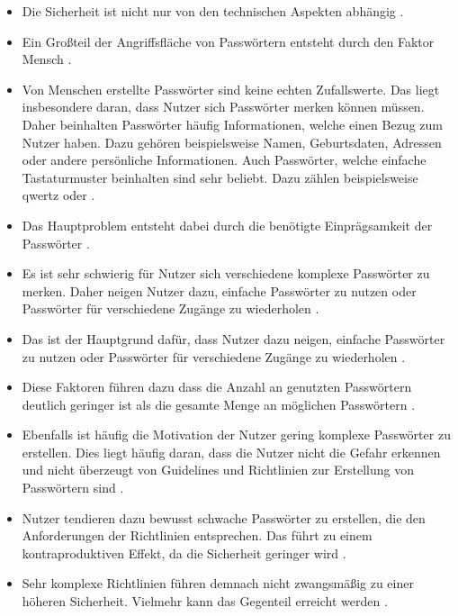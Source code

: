 \begin{itemize}
    \item Die Sicherheit ist nicht nur von den technischen Aspekten abhängig \cite{ives2004domino}.
    \item Ein Großteil der Angriffsfläche von Passwörtern entsteht durch den Faktor Mensch \cite{yildirim2019encouraging}.
    \item Von Menschen erstellte Passwörter sind keine echten Zufallswerte. Das liegt insbesondere daran, dass Nutzer sich Passwörter merken können müssen. Daher beinhalten Passwörter häufig Informationen, welche einen Bezug zum Nutzer haben. Dazu gehören beispielsweise Namen, Geburtsdaten, Adressen oder andere persönliche Informationen. Auch Passwörter, welche einfache Tastaturmuster beinhalten sind sehr beliebt. Dazu zählen beispielsweise \glqq qwertz\grqq{} oder \grqq{} \cite{chanda2016password} \cite{boonkrong2012security} \cite{yildirim2019encouraging}.
    \item Das Hauptproblem entsteht dabei durch die benötigte Einprägsamkeit der Passwörter \cite{yildirim2019encouraging}.
    \item Es ist sehr schwierig für Nutzer sich verschiedene komplexe Passwörter zu merken. Daher neigen Nutzer dazu, einfache Passwörter zu nutzen oder Passwörter für verschiedene Zugänge zu wiederholen \cite{chanda2016password}.
    \item Das ist der Hauptgrund dafür, dass Nutzer dazu neigen, einfache Passwörter zu nutzen oder Passwörter für verschiedene Zugänge zu wiederholen \cite{yildirim2019encouraging}.
    \item Diese Faktoren führen dazu dass die Anzahl an genutzten Passwörtern deutlich geringer ist als die gesamte Menge an möglichen Passwörtern \cite{boonkrong2012security}.
    \item Ebenfalls ist häufig die Motivation der Nutzer gering komplexe Passwörter zu erstellen. Dies liegt häufig daran, dass die Nutzer nicht die Gefahr erkennen und nicht überzeugt von Guidelines und Richtlinien zur Erstellung von Passwörtern sind \cite{yildirim2019encouraging}.
    \item Nutzer tendieren dazu bewusst schwache Passwörter zu erstellen, die den Anforderungen der Richtlinien entsprechen. Das führt zu einem kontraproduktiven Effekt, da die Sicherheit geringer wird \cite{yildirim2019encouraging}.
    \item Sehr komplexe Richtlinien führen demnach nicht zwangsmäßig zu einer höheren Sicherheit. Vielmehr kann das Gegenteil erreicht werden \cite{yildirim2019encouraging}.

\end{itemize}

